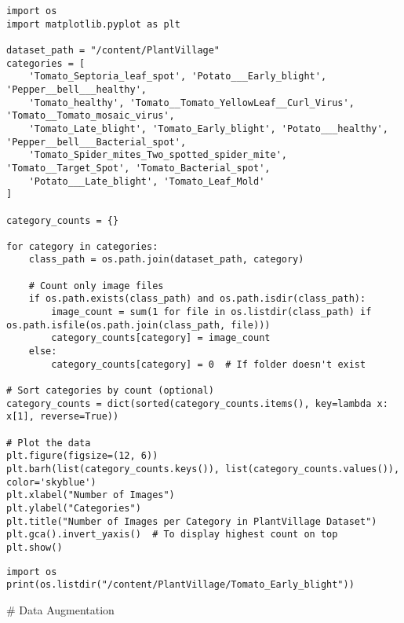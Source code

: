 \documentclass{article}
\begin{document}
\begin{lstlisting}
import os
import matplotlib.pyplot as plt

dataset_path = "/content/PlantVillage"
categories = [
    'Tomato_Septoria_leaf_spot', 'Potato___Early_blight', 'Pepper__bell___healthy',
    'Tomato_healthy', 'Tomato__Tomato_YellowLeaf__Curl_Virus', 'Tomato__Tomato_mosaic_virus',
    'Tomato_Late_blight', 'Tomato_Early_blight', 'Potato___healthy', 'Pepper__bell___Bacterial_spot',
    'Tomato_Spider_mites_Two_spotted_spider_mite', 'Tomato__Target_Spot', 'Tomato_Bacterial_spot',
    'Potato___Late_blight', 'Tomato_Leaf_Mold'
]

category_counts = {}

for category in categories:
    class_path = os.path.join(dataset_path, category)

    # Count only image files
    if os.path.exists(class_path) and os.path.isdir(class_path):
        image_count = sum(1 for file in os.listdir(class_path) if os.path.isfile(os.path.join(class_path, file)))
        category_counts[category] = image_count
    else:
        category_counts[category] = 0  # If folder doesn't exist

# Sort categories by count (optional)
category_counts = dict(sorted(category_counts.items(), key=lambda x: x[1], reverse=True))

# Plot the data
plt.figure(figsize=(12, 6))
plt.barh(list(category_counts.keys()), list(category_counts.values()), color='skyblue')
plt.xlabel("Number of Images")
plt.ylabel("Categories")
plt.title("Number of Images per Category in PlantVillage Dataset")
plt.gca().invert_yaxis()  # To display highest count on top
plt.show()
\end{lstlisting}
\begin{lstlisting}
import os
print(os.listdir("/content/PlantVillage/Tomato_Early_blight"))
\end{lstlisting}
# Data Augmentation
\end{document}
